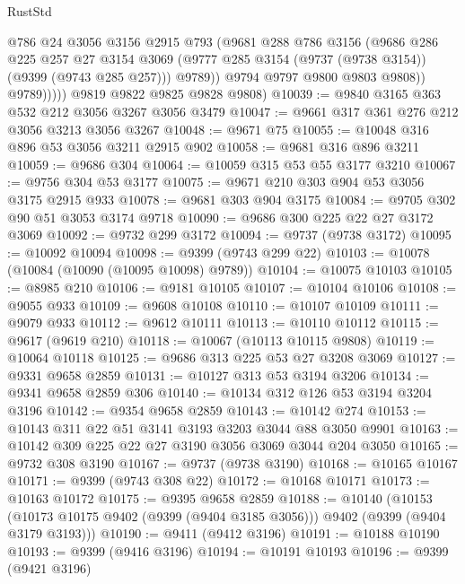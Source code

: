 \begin{lexlean}{RustStd}
\begin{coremodule}
                    @786
                    @24
                    @3056
                    @3156
                    @2915
                    @793
                    (@9681
                      @288
                      @786
                      @3156
                      (@9686
                        @286
                        @225
                        @257
                        @27
                        @3154
                        @3069
                        (@9777 @285 @3154 (@9737 (@9738 @3154)) (@9399 (@9743 @285 @257)))
                        @9789))
                    @9794
                    @9797
                    @9800
                    @9803
                    @9808))
                @9789)))))
      @9819
      @9822
      @9825
      @9828
      @9808)
@10039 := @9840 @3165 @363 @532 @212 @3056 @3267 @3056 @3479
@10047 := @9661 @317 @361 @276 @212 @3056 @3213 @3056 @3267
@10048 := @9671 @75
@10055 := @10048 @316 @896 @53 @3056 @3211 @2915 @902
@10058 := @9681 @316 @896 @3211
@10059 := @9686 @304
@10064 := @10059 @315 @53 @55 @3177 @3210
@10067 := @9756 @304 @53 @3177
@10075 := @9671 @210 @303 @904 @53 @3056 @3175 @2915 @933
@10078 := @9681 @303 @904 @3175
@10084 := @9705 @302 @90 @51 @3053 @3174 @9718
@10090 := @9686 @300 @225 @22 @27 @3172 @3069
@10092 := @9732 @299 @3172
@10094 := @9737 (@9738 @3172)
@10095 := @10092 @10094
@10098 := @9399 (@9743 @299 @22)
@10103 := @10078 (@10084 (@10090 (@10095 @10098) @9789))
@10104 := @10075 @10103
@10105 := @8985 @210
@10106 := @9181 @10105
@10107 := @10104 @10106
@10108 := @9055 @933
@10109 := @9608 @10108
@10110 := @10107 @10109
@10111 := @9079 @933
@10112 := @9612 @10111
@10113 := @10110 @10112
@10115 := @9617 (@9619 @210)
@10118 := @10067 (@10113 @10115 @9808)
@10119 := @10064 @10118
@10125 := @9686 @313 @225 @53 @27 @3208 @3069
@10127 := @9331 @9658 @2859
@10131 := @10127 @313 @53 @3194 @3206
@10134 := @9341 @9658 @2859 @306
@10140 := @10134 @312 @126 @53 @3194 @3204 @3196
@10142 := @9354 @9658 @2859
@10143 := @10142 @274
@10153 := @10143 @311 @22 @51 @3141 @3193 @3203 @3044 @88 @3050 @9901
@10163 := @10142 @309 @225 @22 @27 @3190 @3056 @3069 @3044 @204 @3050
@10165 := @9732 @308 @3190
@10167 := @9737 (@9738 @3190)
@10168 := @10165 @10167
@10171 := @9399 (@9743 @308 @22)
@10172 := @10168 @10171
@10173 := @10163 @10172
@10175 := @9395 @9658 @2859
@10188 := @10140
    (@10153 (@10173 @10175 @9402 (@9399 (@9404 @3185 @3056))) @9402 (@9399 (@9404 @3179 @3193)))
@10190 := @9411 (@9412 @3196)
@10191 := @10188 @10190
@10193 := @9399 (@9416 @3196)
@10194 := @10191 @10193
@10196 := @9399 (@9421 @3196)

\end{coremodule}
\end{lexlean}
